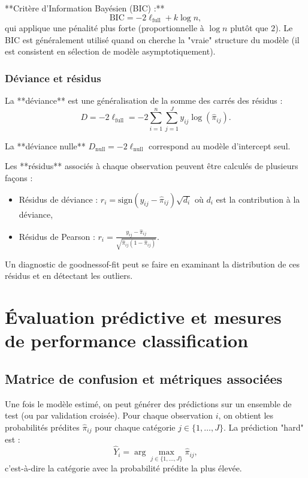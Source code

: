 \documentclass[12pt,a4paper]{article}
\begin{document}
**Critère d'Information Bayésien (BIC) :**
\begin{equation}\label{eq:bic}
\text{BIC} = -2\ell_\text{full} + k \log n,
\end{equation}
qui applique une pénalité plus forte (proportionnelle à $\log n$ plutôt que $2$). Le BIC est généralement utilisé quand on cherche la "vraie" structure du modèle (il est consistent en sélection de modèle asymptotiquement).

\subsubsection{Déviance et résidus}

La **déviance** est une généralisation de la somme des carrés des résidus :
\begin{equation}\label{eq:deviance}
D = -2\ell_\text{full} = -2 \sum_{i=1}^{n}\sum_{j=1}^{J} y_{ij}\log(\widehat{\pi}_{ij}).
\end{equation}

La **déviance nulle** $D_\text{null} = -2\ell_\text{null}$ correspond au modèle d'intercept seul.

Les **résidus** associés à chaque observation peuvent être calculés de plusieurs façons :
\begin{itemize}
    \item Résidus de déviance : $r_i = \text{sign}(y_{ij} - \widehat{\pi}_{ij}) \sqrt{d_i}$ où $d_i$ est la contribution à la déviance,
    \item Résidus de Pearson : $r_i = \frac{y_{ij} - \widehat{\pi}_{ij}}{\sqrt{\widehat{\pi}_{ij}(1-\widehat{\pi}_{ij})}}$.
\end{itemize}

Un diagnostic de goodnessof-fit peut se faire en examinant la distribution de ces résidus et en détectant les outliers.

\section{Évaluation prédictive et mesures de performance classification}

\subsection{Matrice de confusion et métriques associées}

Une fois le modèle estimé, on peut générer des prédictions sur un ensemble de test (ou par validation croisée). Pour chaque observation $i$, on obtient les probabilités prédites $\widehat{\pi}_{ij}$ pour chaque catégorie $j \in \{1, \dots, J\}$. La prédiction "hard" est :
\begin{equation}\label{eq:prediction-hard}
\widehat{Y}_i = \arg\max_{j \in \{1,\dots,J\}} \widehat{\pi}_{ij},
\end{equation}
c'est-à-dire la catégorie avec la probabilité prédite la plus élevée.
\end{document}
